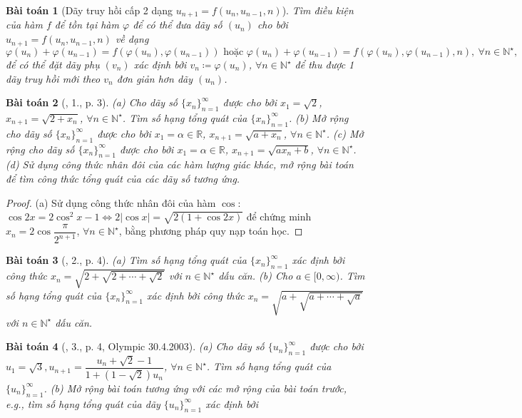\documentclass{article}
\newtheorem{baitoan}{Bài toán}
\begin{document}
\begin{baitoan}[Dãy truy hồi cấp 2 dạng $u_{n+1} = f(u_n,u_{n-1},n)$]
	Tìm điều kiện của hàm $f$ để tồn tại hàm $\varphi$ để có thể đưa dãy số $(u_n)$ cho bởi $u_{n+1} = f(u_n,u_{n-1},n)$ về dạng
	\begin{equation*}
		\varphi(u_n) + \varphi(u_{n-1}) = f(\varphi(u_n),\varphi(u_{n-1}))\mbox{ hoặc }\varphi(u_n) + \varphi(u_{n-1}) = f(\varphi(u_n),\varphi(u_{n-1}),n),\ \forall n\in\mathbb{N}^\star,
	\end{equation*}
	để có thể đặt dãy phụ $(v_n)$ xác định bởi $v_n\coloneqq\varphi(u_n)$, $\forall n\in\mathbb{N}^\star$ để thu được 1 dãy truy hồi mới theo $v_n$ đơn giản hơn dãy $(u_n)$.
\end{baitoan}

\begin{baitoan}[\cite{Chung_day_so}, 1., p. 3]
	(a) Cho dãy số $\{x_n\}_{n=1}^\infty$ được cho bởi $x_1 = \sqrt{2}$, $x_{n+1} = \sqrt{2 + x_n}$, $\forall n\in\mathbb{N}^\star$. Tìm số hạng tổng quát của $\{x_n\}_{n=1}^\infty$. (b) Mở rộng cho dãy số $\{x_n\}_{n=1}^\infty$ được cho bởi $x_1 = \alpha\in\mathbb{R}$, $x_{n+1} = \sqrt{a + x_n}$, $\forall n\in\mathbb{N}^\star$. (c) Mở rộng cho dãy số $\{x_n\}_{n=1}^\infty$ được cho bởi $x_1 = \alpha\in\mathbb{R}$, $x_{n+1} = \sqrt{ax_n + b}$, $\forall n\in\mathbb{N}^\star$. (d) Sử dụng công thức nhân đôi của các hàm lượng giác khác, mở rộng bài toán để tìm công thức tổng quát của các dãy số tương ứng.
\end{baitoan}

\begin{proof}
	(a) Sử dụng công thức nhân đôi của hàm $\cos$: $\cos2x = 2\cos^2x - 1\Leftrightarrow2|\cos x| = \sqrt{2(1 + \cos2x)}$ để chứng minh $x_n = 2\cos\dfrac{\pi}{2^{n+1}}$, $\forall n\in\mathbb{N}^\star$, bằng phương pháp quy nạp toán học.
\end{proof}

\begin{baitoan}[\cite{Chung_day_so}, 2., p. 4]
	(a) Tìm số hạng tổng quát của $\{x_n\}_{n=1}^\infty$ xác định bởi công thức $x_n = \sqrt{2 + \sqrt{2 + \cdots + \sqrt{2}}}$ với $n\in\mathbb{N}^\star$ dấu căn. (b) Cho $a\in[0,\infty)$. Tìm số hạng tổng quát của $\{x_n\}_{n=1}^\infty$ xác định bởi công thức $x_n = \sqrt{a + \sqrt{a + \cdots + \sqrt{a}}}$ với $n\in\mathbb{N}^\star$ dấu căn.
\end{baitoan}

\begin{baitoan}[\cite{Chung_day_so}, 3., p. 4, Olympic 30.4.2003]
	(a) Cho dãy số $\{u_n\}_{n=1}^\infty$ được cho bởi $u_1 = \sqrt{3},u_{n+1} = \dfrac{u_n + \sqrt{2} - 1}{1 + (1 - \sqrt{2})u_n}$, $\forall n\in\mathbb{N}^\star$. Tìm số hạng tổng quát của $\{u_n\}_{n=1}^\infty$. (b) Mở rộng bài toán tương ứng với các mở rộng của bài toán trước, e.g., tìm số hạng tổng quát của dãy $\{u_n\}_{n=1}^\infty$ xác định bởi 
\end{baitoan}
\end{document}

